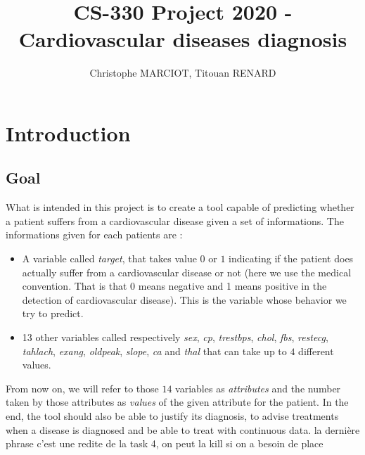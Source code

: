 \documentclass[9pt]{extarticle}
\title{CS-330 Project 2020 - Cardiovascular diseases diagnosis}   %
\author{Christophe MARCIOT, Titouan RENARD}         %
\begin{document}
\maketitle

\section{Introduction}

\subsection{Goal}

What is intended in this project is to create a tool capable of predicting whether a patient suffers from a cardiovascular disease given a set of informations.
The informations given for each patients are :
	\begin{itemize}
		\item A variable called \emph{target}, that takes value $0$ or $1$ indicating if the patient does actually suffer from a cardiovascular disease or not (here we use the medical convention. That is that 0 means negative and 1 means positive in the detection of cardiovascular disease). This is the variable whose behavior we try to predict.
		\item 13 other variables called respectively \emph{sex}, \emph{cp}, \emph{trestbps}, \emph{chol}, \emph{fbs}, \emph{restecg}, \emph{tahlach}, \emph {exang}, \emph{oldpeak}, \emph{slope}, \emph{ca} and \emph{thal} that can take up to $4$ different values.
	\end{itemize}
From now on, we will refer to those $14$  variables as \emph{attributes} and the number taken by those attributes as \emph{values} of the given attribute for the patient. In the end, the tool should also be able to justify its diagnosis, to advise treatments when a disease is diagnosed and be able to treat with continuous data. la dernière phrase c'est une redite de la task 4, on peut la kill si on a besoin de place
\end{document}
